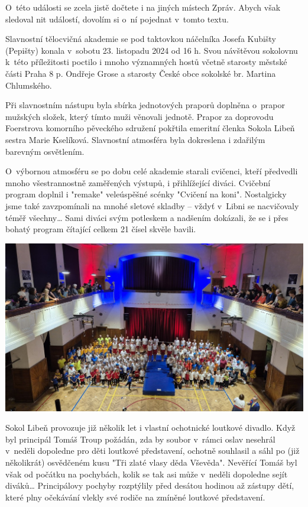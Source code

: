 \documentclass[11pt]{article}
\begin{document}

O~této události se zcela jistě dočtete i na jiných místech Zpráv. Abych
však sledoval nit událostí, dovolím si o~ní pojednat v~tomto textu.

Slavnostní tělocvičná akademie se pod taktovkou náčelníka Josefa Kubišty
(Pepišty) konala v~sobotu 23. listopadu 2024 od 16 h. Svou návštěvou
sokolovnu k~této příležitosti poctilo i mnoho významných hostů včetně
starosty městské části Praha 8 p. Ondřeje Grose a starosty České obce
sokolské br. Martina Chlumského.

Při slavnostním nástupu byla sbírka jednotových praporů doplněna
o~prapor mužských složek, který tímto muži věnovali jednotě. Prapor za
doprovodu Foerstrova komorního pěveckého sdružení pokřtila emeritní
členka Sokola Libeň sestra Marie Kselíková. Slavnostní atmosféra byla
dokreslena i zdařilým barevným osvětlením.

O~výbornou atmosféru se po dobu celé akademie starali cvičenci, kteří
předvedli mnoho všestrannostně zaměřených výstupů, i přihlížející
diváci. Cvičební program doplnil i "remake" veleúspěšné scénky "Cvičení
na koni". Nostalgicky jsme také zavzpomínali na mnohé sletové skladby
-- vždyť v~Libni se nacvičovaly téměř všechny\ldots{} Sami diváci svým
potleskem a nadšením dokázali, že se i přes bohatý program čítající
celkem 21 čísel skvěle bavili.

\begin{center}
  \includegraphics[width=0.7\linewidth]{./FOTKY ZPRAVY/AKADEMIE.jpg}
\end{center}

Sokol Libeň provozuje již několik let i vlastní ochotnické loutkové
divadlo. Když byl principál Tomáš Troup požádán, zda by soubor v~rámci
oslav nesehrál v~neděli dopoledne pro děti loutkové představení, ochotně
souhlasil a sáhl po (již několikrát) osvědčeném kusu "Tři zlaté vlasy
děda Vševěda". Nevěřící Tomáš byl však od počátku na pochybách, kolik
se tak asi může v~neděli dopoledne sejít diváků\ldots{} Principálovy
pochyby rozptýlily před desátou hodinou až zástupy dětí, které plny
očekávání vlekly své rodiče na zmíněné loutkové představení.
\end{document}
